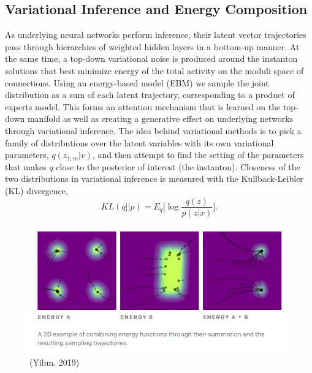 \documentclass{article}
\begin{document}
\subsection{Variational Inference and Energy Composition}
    As underlying neural networks perform inference, their latent vector trajectories pass through hierarchies of weighted hidden layers in a bottom-up manner. At the same time, a top-down variational noise is produced around the instanton solutions that best minimize energy of the total activity on the moduli space of connections. Using an energy-based model (EBM) we sample the joint distribution as a sum of each latent trajectory, corresponding to a product of experts model. This forms an attention mechanism that is learned on the top-down manifold as well as creating a generative effect on underlying networks through variational inference. The idea behind variational methods is to pick a family of distributions over the latent variables with its own variational parameters, $q(z_{1:m} | v)$, and then attempt to find the setting of the parameters that makes $q$ close to the posterior of interest (the instanton). Closeness of the two distributions in variational inference is measured with the Kullback-Leibler (KL) divergence, 
    \begin{equation}
         \displaystyle KL(q||p)=  E_q\bigg[ \log \frac{ q(z)}{p(z | x)} \bigg].
    \end{equation}
    \begin{figure}[H]
        \centering
        \includegraphics[width=13cm]{openai-ebm.png}
        \vspace{-0.87cm}
        \\  (Yilun, 2019)
    \end{figure}
    
\end{document}

